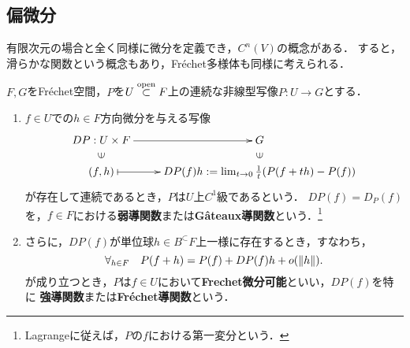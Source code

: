 \documentclass[uplatex,dvipdfmx]{jsreport}
\begin{document}
\subsection{偏微分}

\begin{tcolorbox}[colframe=ForestGreen, colback=ForestGreen!10!white,breakable,colbacktitle=ForestGreen!40!white,coltitle=black,fonttitle=\bfseries\sffamily,
title=]
    有限次元の場合と全く同様に微分を定義でき，$C^n(V)$の概念がある．
    すると，滑らかな関数という概念もあり，Fréchet多様体も同様に考えられる．
\end{tcolorbox}

\begin{definition}
    $F,G$をFréchet空間，$P$を$U\overset{\mathrm{open}}{\subset} F$上の連続な非線型写像$P:U\to G$とする．
    \begin{enumerate}
        \item 
    $f\in U$での$h\in F$方向微分を与える写像
    \[\xymatrix@R-2pc{
        DP:U\times F\ar[r]&G\\
        \rotatebox[origin=c]{90}{$\in$}&\rotatebox[origin=c]{90}{$\in$}\\
        (f,h)\ar@{|->}[r]&DP(f)h:=\lim_{t\to0}\frac{1}{t}(P(f+th)-P(f))
    }\]
    が存在して連続であるとき，$P$は$U$上$C^1$級であるという．
    $DP(f)=D_P(f)$を，$f\in F$における\textbf{弱導関数}または\textbf{Gâteaux導関数}という．\footnote{Lagrangeに従えば，$P$の$f$における第一変分という．}
    \item さらに，$DP(f)$が単位球$h\in B^\subset F$上一様に存在するとき，すなわち，
    \[\forall_{h\in F}\quad P(f+h)=P(f)+DP(f)h+o(\|h\|).\]
    が成り立つとき，$P$は$f\in U$において\textbf{Frechet微分可能}といい，$DP(f)$を特に
    \textbf{強導関数}または\textbf{Fréchet導関数}という．
    \end{enumerate}
\end{definition}
\end{document}
